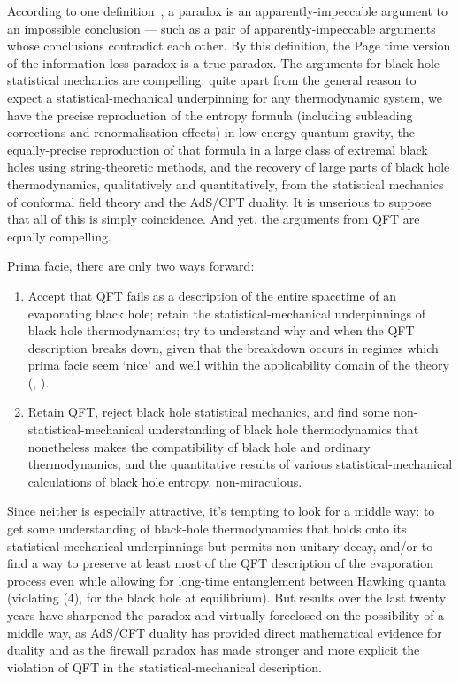\documentclass{article}
\begin{document}
According to one definition~\cite[ch.1]{quineparadox}, a paradox is an apparently-impeccable argument to an impossible conclusion --- such as a pair of apparently-impeccable arguments whose conclusions contradict each other. By this definition, the Page time version of the information-loss paradox is a true paradox. The arguments for black hole statistical mechanics are compelling: quite apart from the general reason to expect a statistical-mechanical underpinning for any thermodynamic system, we have the precise reproduction of the entropy formula (including subleading corrections and renormalisation effects) in low-energy quantum gravity, the equally-precise reproduction of that formula in a large class of extremal black holes using string-theoretic methods, and the recovery of large parts of black hole thermodynamics, qualitatively and quantitatively, from the statistical mechanics of conformal field theory and the AdS/CFT duality. It is unserious to suppose that all of this is simply coincidence. And yet, the arguments from QFT are equally compelling.

Prima facie, there are only two ways forward:
\begin{enumerate}
\item Accept that QFT fails as a description of the entire spacetime of an evaporating black hole; retain the statistical-mechanical underpinnings of black hole thermodynamics; try to understand why and when the QFT description breaks down, given that the breakdown occurs in regimes which prima facie seem `nice' and well within the applicability domain of the theory (, ).
\item Retain QFT, reject black hole statistical mechanics, and find some non-statistical-mechanical understanding of black hole thermodynamics that nonetheless makes the compatibility of black hole and ordinary thermodynamics, and the quantitative results of various statistical-mechanical calculations of black hole entropy, non-miraculous.
\end{enumerate}
Since neither is especially attractive, it's tempting to look for a middle way: to get some understanding of black-hole thermodynamics that holds onto its statistical-mechanical underpinnings but permits non-unitary decay, and/or to find a way to preserve at least most of the QFT description of the evaporation process even while allowing for long-time entanglement between Hawking quanta (violating (4), for the black hole at equilibrium). But results over the last twenty years have sharpened the paradox and virtually foreclosed on the possibility of a middle way, as AdS/CFT duality has provided direct mathematical evidence for duality and as the firewall paradox has made stronger and more explicit the violation of QFT in the statistical-mechanical description.
\end{document}
